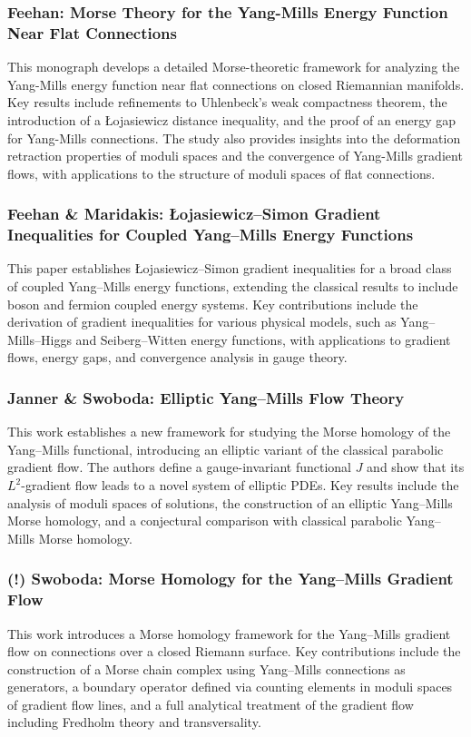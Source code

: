 \documentclass[10pt, letterpaper]{article}
\begin{document}
\subsubsection{Feehan: Morse Theory for the Yang-Mills Energy Function Near Flat Connections \cite{feehan2024morse}} 
This monograph develops a detailed Morse-theoretic framework for analyzing the Yang-Mills energy function near flat connections on closed Riemannian manifolds. Key results include refinements to Uhlenbeck's weak compactness theorem, the introduction of a \L{}ojasiewicz distance inequality, and the proof of an energy gap for Yang-Mills connections. The study also provides insights into the deformation retraction properties of moduli spaces and the convergence of Yang-Mills gradient flows, with applications to the structure of moduli spaces of flat connections.


\subsubsection{Feehan \& Maridakis: \L{}ojasiewicz–Simon Gradient Inequalities for Coupled Yang–Mills Energy Functions \cite{feehan2019lojasiewicz}} 
This paper establishes \L{}ojasiewicz–Simon gradient inequalities for a broad class of coupled Yang–Mills energy functions, extending the classical results to include boson and fermion coupled energy systems. Key contributions include the derivation of gradient inequalities for various physical models, such as Yang–Mills–Higgs and Seiberg–Witten energy functions, with applications to gradient flows, energy gaps, and convergence analysis in gauge theory.



\subsubsection{Janner \& Swoboda: Elliptic Yang–Mills Flow Theory \cite{janner2013elliptic}} 
This work establishes a new framework for studying the Morse homology of the Yang–Mills functional, introducing an elliptic variant of the classical parabolic gradient flow. The authors define a gauge-invariant functional \( J \) and show that its \( L^2 \)-gradient flow leads to a novel system of elliptic PDEs. Key results include the analysis of moduli spaces of solutions, the construction of an elliptic Yang–Mills Morse homology, and a conjectural comparison with classical parabolic Yang–Mills Morse homology.


\subsubsection{(!) Swoboda: Morse Homology for the Yang–Mills Gradient Flow \cite{swoboda2018morse}} 
This work introduces a Morse homology framework for the Yang–Mills gradient flow on connections over a closed Riemann surface. Key contributions include the construction of a Morse chain complex using Yang–Mills connections as generators, a boundary operator defined via counting elements in moduli spaces of gradient flow lines, and a full analytical treatment of the gradient flow including Fredholm theory and transversality.
\end{document}

